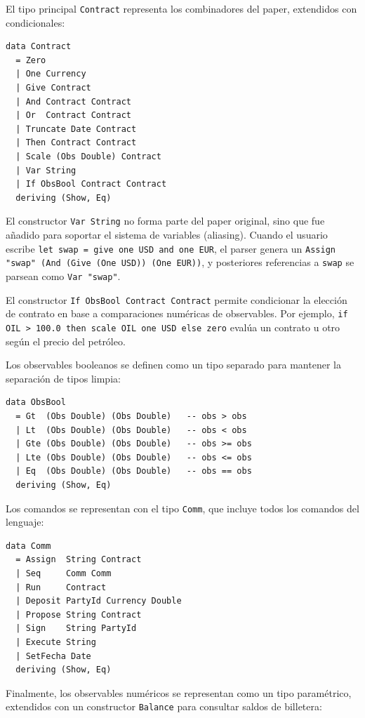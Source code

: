 \documentclass[a4paper, 12pt]{article}
\begin{document}
El tipo principal \texttt{Contract} representa los combinadores del paper, extendidos con condicionales:

\begin{lstlisting}[caption={Tipo de datos Contract (AST.hs)}]
data Contract
  = Zero
  | One Currency
  | Give Contract
  | And Contract Contract
  | Or  Contract Contract
  | Truncate Date Contract
  | Then Contract Contract
  | Scale (Obs Double) Contract
  | Var String
  | If ObsBool Contract Contract
  deriving (Show, Eq)
\end{lstlisting}

El constructor \texttt{Var String} no forma parte del paper original, sino que fue añadido para soportar el sistema de variables (aliasing). Cuando el usuario escribe \texttt{let swap = give one USD and one EUR}, el parser genera un \texttt{Assign "swap" (And (Give (One USD)) (One EUR))}, y posteriores referencias a \texttt{swap} se parsean como \texttt{Var "swap"}.

El constructor \texttt{If ObsBool Contract Contract} permite condicionar la elección de contrato en base a comparaciones numéricas de observables. Por ejemplo, \texttt{if OIL > 100.0 then scale OIL one USD else zero} evalúa un contrato u otro según el precio del petróleo.

Los observables booleanos se definen como un tipo separado para mantener la separación de tipos limpia:

\begin{lstlisting}[caption={Tipo de datos ObsBool (AST.hs)}]
data ObsBool
  = Gt  (Obs Double) (Obs Double)   -- obs > obs
  | Lt  (Obs Double) (Obs Double)   -- obs < obs
  | Gte (Obs Double) (Obs Double)   -- obs >= obs
  | Lte (Obs Double) (Obs Double)   -- obs <= obs
  | Eq  (Obs Double) (Obs Double)   -- obs == obs
  deriving (Show, Eq)
\end{lstlisting}

Los comandos se representan con el tipo \texttt{Comm}, que incluye todos los comandos del lenguaje:

\begin{lstlisting}[caption={Tipo de datos Comm (AST.hs)}]
data Comm
  = Assign  String Contract
  | Seq     Comm Comm
  | Run     Contract
  | Deposit PartyId Currency Double
  | Propose String Contract
  | Sign    String PartyId
  | Execute String
  | SetFecha Date
  deriving (Show, Eq)
\end{lstlisting}

Finalmente, los observables numéricos se representan como un tipo paramétrico, extendidos con un constructor \texttt{Balance} para consultar saldos de billetera:
\end{document}
